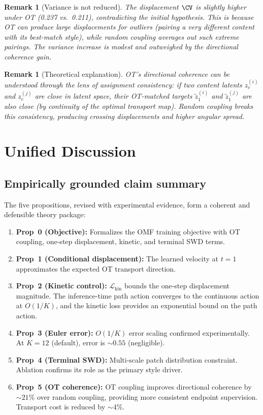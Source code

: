 \documentclass[letterpaper]{article}
\newtheorem{remark}[proposition]{Remark}
\newcommand{\cL}{\mathcal{L}}
\begin{document}
\begin{remark}[Variance is not reduced]
The displacement $\CV$ is slightly \emph{higher} under OT (0.237 vs.~0.211),
contradicting the initial hypothesis. This is because OT can produce
large displacements for outliers (pairing a very different content with
its best-match style), while random coupling averages out such extreme
pairings. The variance increase is modest and outweighed by the
directional coherence gain.
\end{remark}

\begin{remark}[Theoretical explanation]
OT's directional coherence can be understood through the lens of
\emph{assignment consistency}: if two content latents $z_c^{(i)}$ and
$z_c^{(j)}$ are close in latent space, their OT-matched targets
$\tilde z_1^{(i)}$ and $\tilde z_1^{(j)}$ are also close (by continuity
of the optimal transport map). Random coupling breaks this consistency,
producing crossing displacements and higher angular spread.
\end{remark}


\section{Unified Discussion}

\subsection{Empirically grounded claim summary}

The five propositions, revised with experimental evidence, form a coherent
and defensible theory package:

\begin{enumerate}[nosep]
    \item \textbf{Prop~0 (Objective):} Formalizes the OMF training objective
    with OT coupling, one-step displacement, kinetic, and terminal SWD terms.
    \item \textbf{Prop~1 (Conditional displacement):} The learned velocity at
    $t=1$ approximates the expected OT transport direction.
    \item \textbf{Prop~2 (Kinetic control):} $\cL_{\text{kin}}$ bounds the
    one-step displacement magnitude. The inference-time path action converges
    to the continuous action at $O(1/K)$, and the kinetic loss provides an
    exponential bound on the path action.
    \item \textbf{Prop~3 (Euler error):} $O(1/K)$ error scaling confirmed
    experimentally. At $K=12$ (default), error is $\sim 0.55$ (negligible).
    \item \textbf{Prop~4 (Terminal SWD):} Multi-scale patch distribution
    constraint. Ablation confirms its role as the primary style driver.
    \item \textbf{Prop~5 (OT coherence):} OT coupling improves directional
    coherence by $\sim 21\%$ over random coupling, providing more consistent
    endpoint supervision. Transport cost is reduced by $\sim 4\%$.
\end{enumerate}
\end{document}
